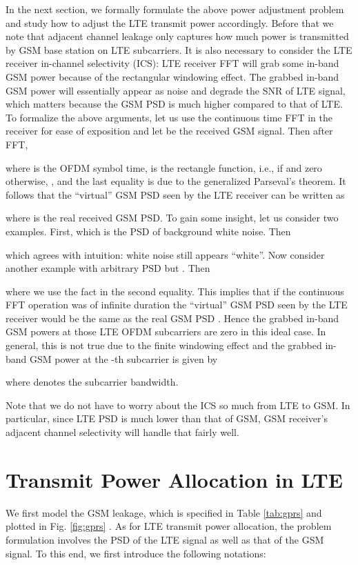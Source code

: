 \documentclass[10pt,journal]{IEEEtran}
\theoremstyle{slplain}
\begin{document}
In the next section, we formally formulate the above power adjustment problem and study how to adjust the LTE transmit power accordingly. Before that we note that adjacent channel leakage only captures how much power is transmitted by GSM base station on LTE subcarriers. It is also necessary to consider  the LTE  receiver in-channel selectivity (ICS): LTE receiver FFT will grab some in-band GSM power because of the rectangular windowing effect.
The grabbed in-band GSM power will essentially appear as noise and degrade the SNR of LTE signal, which matters because the GSM PSD is much higher compared to that of LTE. To formalize the above arguments, let us use the continuous time FFT in the receiver for ease of exposition and let  be the received GSM signal. Then after FFT,

where  is the OFDM symbol time,  is the rectangle function, i.e.,  if  and zero otherwise, , and the last equality is due to the generalized Parseval's theorem. It follows that the ``virtual'' GSM PSD seen by the LTE receiver can be written as

where  is the real received GSM PSD. To gain some insight, let us consider two examples. First,  which is the PSD of background white noise. Then

which agrees with intuition: white noise still appears ``white''. Now consider another example with arbitrary PSD  but . Then

where  we use the fact  in the second equality.
This implies that if the continuous FFT operation was of infinite duration the ``virtual'' GSM PSD  seen by the LTE receiver would be the same as the real GSM PSD . Hence the grabbed in-band GSM powers at those LTE OFDM subcarriers  are  zero in this ideal case. In general, this is not true due to the finite windowing effect and  the grabbed in-band GSM power at the -th subcarrier is given by

where  denotes the subcarrier bandwidth.

Note that we do not have to worry about the ICS so much from LTE to GSM. In particular, since  LTE PSD is much lower than that of GSM, GSM receiver's adjacent channel selectivity will handle that fairly well.




\section{Transmit Power Allocation in LTE}
\label{sec:transmitpoweralloc}
We first model the GSM leakage, which is specified in Table \ref{tab:gprs} and plotted  in Fig. \ref{fig:gprs} \cite{ETSIgsm}. As for  LTE transmit power allocation, the problem formulation involves the PSD of the LTE signal as well as that of the GSM signal. To this end, we first introduce the following notations:
\end{document}
